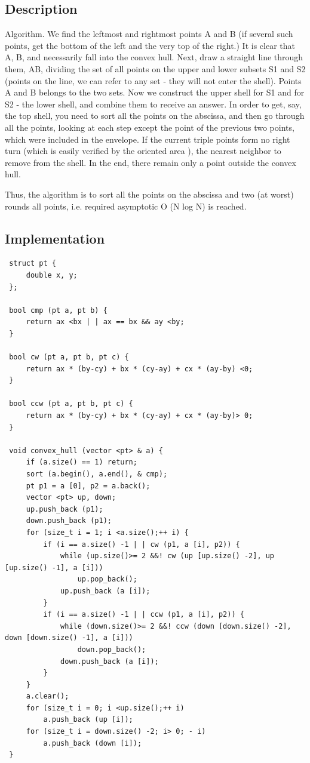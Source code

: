 \subsection{ Description }
Algorithm. We find the leftmost and rightmost points A and B (if several such points, get the bottom of the left and the very top of the right.) It is clear that A, B, and necessarily fall into the convex hull. Next, draw a straight line through them, AB, dividing the set of all points on the upper and lower subsets S1 and S2 (points on the line, we can refer to any set - they will not enter the shell). Points A and B belongs to the two sets. Now we construct the upper shell for S1 and for S2 - the lower shell, and combine them to receive an answer. In order to get, say, the top shell, you need to sort all the points on the abscissa, and then go through all the points, looking at each step except the point of the previous two points, which were included in the envelope. If the current triple points form no right turn (which is easily verified by the oriented area ), the nearest neighbor to remove from the shell. In the end, there remain only a point outside the convex hull.

Thus, the algorithm is to sort all the points on the abscissa and two (at worst) rounds all points, i.e. required asymptotic O (N log N) is reached.

\subsection{ Implementation }
\begin{verbatim}
 struct pt {
     double x, y;
 };

 bool cmp (pt a, pt b) {
     return ax <bx | | ax == bx && ay <by;
 }

 bool cw (pt a, pt b, pt c) {
     return ax * (by-cy) + bx * (cy-ay) + cx * (ay-by) <0;
 }

 bool ccw (pt a, pt b, pt c) {
     return ax * (by-cy) + bx * (cy-ay) + cx * (ay-by)> 0;
 }

 void convex_hull (vector <pt> & a) {
     if (a.size() == 1) return;
     sort (a.begin(), a.end(), & cmp);
     pt p1 = a [0], p2 = a.back();
     vector <pt> up, down;
     up.push_back (p1);
     down.push_back (p1);
     for (size_t i = 1; i <a.size();++ i) {
         if (i == a.size() -1 | | cw (p1, a [i], p2)) {
             while (up.size()>= 2 &&! cw (up [up.size() -2], up [up.size() -1], a [i]))
                 up.pop_back();
             up.push_back (a [i]);
         }
         if (i == a.size() -1 | | ccw (p1, a [i], p2)) {
             while (down.size()>= 2 &&! ccw (down [down.size() -2], down [down.size() -1], a [i]))
                 down.pop_back();
             down.push_back (a [i]);
         }
     }
     a.clear();
     for (size_t i = 0; i <up.size();++ i)
         a.push_back (up [i]);
     for (size_t i = down.size() -2; i> 0; - i)
         a.push_back (down [i]);
 } 
\end{verbatim}
